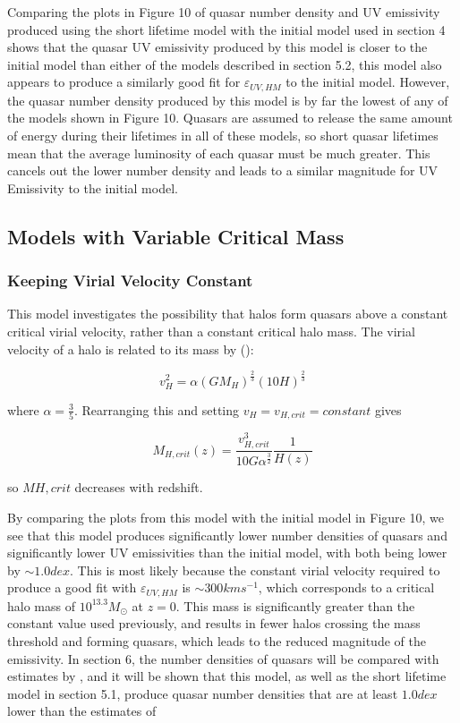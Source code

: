 \documentclass[12pt, twocolumn]{article}%
\begin{document}
Comparing the plots in Figure 10 of quasar number density and UV emissivity produced using the short lifetime model with the initial model used in section 4 shows that the quasar UV emissivity produced by this model is closer to the initial model than either of the models described in section 5.2, this model also appears to produce a similarly good fit for $\varepsilon_{UV,HM}$ to the initial model. However, the quasar number density produced by this model is by far the lowest of any of the models shown in Figure 10. Quasars are assumed to release the same amount of energy during their lifetimes in all of these models, so short quasar lifetimes mean that the average luminosity of each quasar must be much greater. This cancels out the lower number density and leads to a similar magnitude for UV Emissivity to the initial model.

\subsection{Models with Variable Critical Mass}
\subsubsection{Keeping Virial Velocity Constant}

This model investigates the possibility that halos form quasars above a constant critical virial velocity, rather than a constant critical halo mass. The virial velocity of a halo is related to its mass by (\cite{Ikea}):

\begin{equation}
    v_H^2=\alpha(GM_H)^{\frac{2}{3}}(10H)^{\frac{2}{3}}
\end{equation}

\noindent where $\alpha=\frac{3}{5}$. Rearranging this and setting $v_H=v_{H,crit}=constant$ gives

\begin{equation}
    M_{H,crit}(z)=\frac{v_{H,crit}^3}{10G\alpha^{\frac{3}{2}}}\frac{1}{H(z)}
\end{equation}

\noindent so $M{H,crit}$ decreases with redshift.\par

By comparing the plots from this model with the initial model in Figure 10, we see that this model produces significantly lower number densities of quasars and significantly lower UV emissivities than the initial model, with both being lower by $\sim1.0dex$. This is most likely because the constant virial velocity required to produce a good fit with $\varepsilon_{UV,HM}$ is $\sim300kms^{-1}$, which corresponds to a critical halo mass of $10^{13.3}M_\odot$ at $z=0$. This mass is significantly greater than the constant value used previously, and results in fewer halos crossing the mass threshold and forming quasars, which leads to the reduced magnitude of the emissivity. In section 6, the number densities of quasars will be compared with estimates by \cite{Hopkins}, and it will be shown that this model, as well as the short lifetime model in section 5.1, produce quasar number densities that are at least $1.0dex$ lower than the estimates of \citeauthor{Hopkins}
\end{document}
